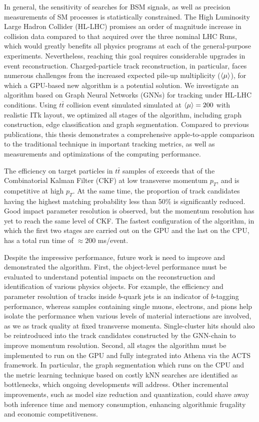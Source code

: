 In general, the sensitivity of searches for BSM signals, as well as precision measurements of SM processes is statistically constrained. 
The High Luminosity Large Hadron Collider (HL-LHC) promises an order of magnitude increase in collision data compared to that acquired over the three nominal LHC Runs, which would greatly benefits all physics programs at each of the general-purpose experiments.
Nevertheless, reaching this goal requires considerable upgrades in event reconstruction.
Charged-particle track reconstruction, in particular, faces numerous challenges from the increased expected pile-up multiplicity ($\expval{\mu}$), for which a GPU-based new algorithm is a potential solution. 
We investigate an algorithm based on Graph Neural Networks (GNNs) for tracking under HL-LHC conditions.
Using $t\bar{t}$ collision event simulated simulated at $\expval{\mu}=200$ with realistic ITk layout, we optimized all stages of the algorithm, including graph construction, edge classification and graph segmentation. 
Compared to previous publications, this thesis demonstrates a comprehensive apple-to-apple comparison to the traditional technique in important tracking metrics, as well as measurements and optimizations of the computing performance.

The efficiency on target particles in $t\bar{t}$ samples of exceeds that of the Combinatorial Kalman Filter (CKF) at low transverse momentum $p_T$, and is competitive at high $p_T$.
At the same time, the proportion of track candidates having the highest matching probability less than 50\% is significantly reduced. 
Good impact parameter resolution is observed, but the momentum resolution has yet to reach the same level of CKF. 
The fastest configuration of the algorithm, in which the first two stages are carried out on the GPU and the last on the CPU, has a total run time of $\approx 200$ ms/event.

Despite the impressive performance, future work is need to improve and demonstrated the algorithm. 
First, the object-level performance must be evaluated to understand potential impacts on the reconstruction and identification of various physics objects. 
For example, the efficiency and parameter resolution of tracks inside $b$-quark jets is an indicator of $b$-tagging performance, whereas samples containing single muons, electrons, and pions help isolate the performance when various levels of material interactions are involved, as we as track quality at fixed transverse momenta.
Single-cluster hits should also be reintroduced into the track candidates constructed by the GNN-chain to improve momentum resolution.
Second, all stages the algorithm must be implemented to run on the GPU and fully integrated into Athena via the ACTS framework. 
In particular, the graph segmentation which runs on the CPU and the metric learning technique based on costly kNN searches are identified as bottlenecks, which ongoing developments will address. 
Other incremental improvements, such as model size reduction and quantization, could shave away both inference time and memory consumption, enhancing algorithmic frugality and economic competitiveness. 
